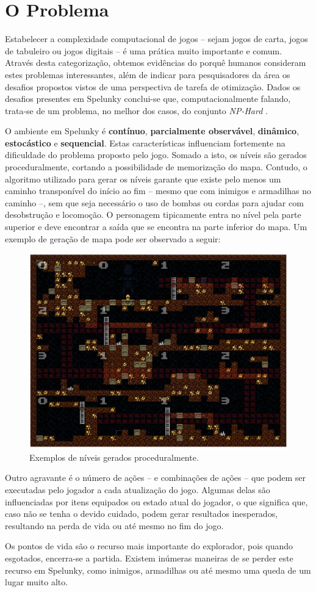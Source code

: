 \chapter{\label{chap:problem}O Problema}
Estabelecer a complexidade computacional de jogos -- sejam jogos de carta,
jogos de tabuleiro ou jogos digitais -- é uma prática muito importante e comum.
Através desta categorização, obtemos evidências do porquê humanos consideram
estes problemas interessantes, além de indicar para pesquisadores da área os
desafios propostos vistos de uma perspectiva de tarefa de otimização.  Dados os
desafios presentes em Spelunky conclui-se que, computacionalmente falando,
trata-se de um problema, no melhor dos casos, do conjunto \textit{NP-Hard}
\cite{SPELUNKYHARD}.

O ambiente em Spelunky é \textbf{contínuo}, \textbf{parcialmente observável},
\textbf{dinâmico}, \textbf{estocástico} e \textbf{sequencial}. Estas
características influenciam fortemente na dificuldade do problema proposto pelo
jogo. Somado a isto, os níveis são gerados proceduralmente, cortando a
possibilidade de memorização do mapa. Contudo, o algoritmo utilizado para gerar
os níveis garante que existe pelo menos um caminho transponível do início ao fim
-- mesmo que com inimigos e armadilhas no caminho --, sem que seja necessário o
uso de bombas ou cordas para ajudar com desobstrução e locomoção. O personagem
tipicamente entra no nível pela parte superior e deve encontrar a saída que se
encontra na parte inferior do mapa. Um exemplo de geração de mapa pode ser
observado a seguir:

\begin{figure}[htb!]
\centering\includegraphics[width=.65\textwidth]{fig/spelunky-level-example.png}
\caption {\label{fig:spelunky-level-example}Exemplos de níveis gerados
proceduralmente.} \end{figure}

Outro agravante é o número de ações -- e combinações de ações -- que podem ser
executadas pelo jogador a cada atualização do jogo. Algumas delas são
influenciadas por itens equipados ou estado atual do jogador, o que significa
que, caso não se tenha o devido cuidado, podem gerar resultados inesperados,
resultando na perda de vida ou até mesmo no fim do jogo.

Os pontos de vida são o recurso mais importante do explorador, pois quando
esgotados, encerra-se a partida. Existem inúmeras maneiras de se perder este
recurso em Spelunky, como inimigos, armadilhas ou até mesmo uma queda de um
lugar muito alto.


